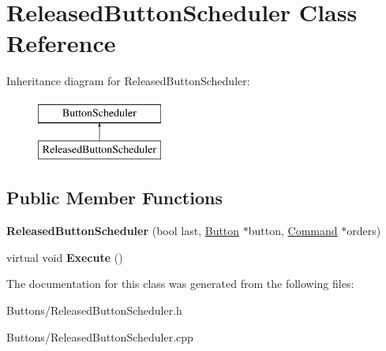 \hypertarget{classReleasedButtonScheduler}{
\section{ReleasedButtonScheduler Class Reference}
\label{classReleasedButtonScheduler}
}
Inheritance diagram for ReleasedButtonScheduler:\begin{figure}[H]
\begin{center}
\leavevmode
\includegraphics[height=2.000000cm]{classReleasedButtonScheduler}
\end{center}
\end{figure}
\subsection*{Public Member Functions}
\begin{DoxyCompactItemize}
\item 
\hypertarget{classReleasedButtonScheduler_a0048c16ff60fc6e51c2406ba0e979fc1}{
{\bfseries ReleasedButtonScheduler} (bool last, \hyperlink{classButton}{Button} $\ast$button, \hyperlink{classCommand}{Command} $\ast$orders)}
\label{classReleasedButtonScheduler_a0048c16ff60fc6e51c2406ba0e979fc1}

\item 
\hypertarget{classReleasedButtonScheduler_ab51aa4655487ff9835e3c25a31aa93a0}{
virtual void {\bfseries Execute} ()}
\label{classReleasedButtonScheduler_ab51aa4655487ff9835e3c25a31aa93a0}

\end{DoxyCompactItemize}


The documentation for this class was generated from the following files:\begin{DoxyCompactItemize}
\item 
Buttons/ReleasedButtonScheduler.h\item 
Buttons/ReleasedButtonScheduler.cpp\end{DoxyCompactItemize}
